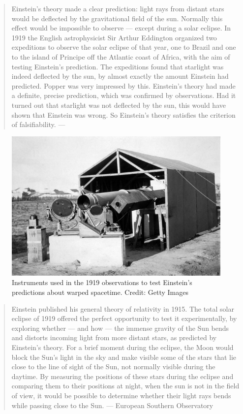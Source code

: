 \documentclass[
]{book}
\begin{document}
\begin{quote}
Einstein's theory made a clear prediction: light rays from distant stars would be deflected by the gravitational field of the sun. Normally this effect would be impossible to observe --- except during a solar eclipse. In 1919 the English astrophysicist Sir Arthur Eddington organized two expeditions to observe the solar eclipse of that year, one to Brazil and one to the island of Principe off the Atlantic coast of Africa, with the aim of testing Einstein's prediction. The expeditions found that starlight was indeed deflected by the sun, by almost exactly the amount Einstein had predicted. Popper was very impressed by this. Einstein's theory had made a definite, precise prediction, which was confirmed by observations. Had it turned out that starlight was not deflected by the sun, this would have shown that Einstein was wrong. So Einstein's theory satisfies the criterion of falsifiability. --- \citep{okasha-pos}
\end{quote}

\begin{figure}

{\centering \includegraphics[width=0.5\linewidth]{Figures/eddington-instruments} 

}

\caption{Instruments used in the 1919 observations to test Einstein's predictions about warped spacetime. Credit: Getty Images}\label{fig:eddington-instruments}
\end{figure}

\begin{quote}
Einstein published his general theory of relativity in 1915. The total solar eclipse of 1919 offered the perfect opportunity to test it experimentally, by exploring whether --- and how --- the immense gravity of the Sun bends and distorts incoming light from more distant stars, as predicted by Einstein's theory. For a brief moment during the eclipse, the Moon would block the Sun's light in the sky and make visible some of the stars that lie close to the line of sight of the Sun, not normally visible during the daytime. By measuring the positions of these stars during the eclipse and comparing them to their positions at night, when the sun is not in the field of view, it would be possible to determine whether their light rays bends while passing close to the Sun. --- European Southern Observatory
\end{quote}
\end{document}
